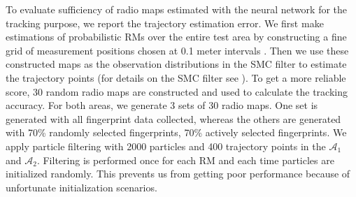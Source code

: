 \documentclass{article}
\begin{document}
	
	To evaluate sufficiency of radio maps estimated with the neural network for the tracking purpose, we report the trajectory estimation error. We first make estimations of probabilistic RMs over the entire test area by constructing a fine grid of measurement positions chosen at 0.1 meter intervals \cite{Ser2017}. Then we use these constructed maps as the observation distributions in the SMC filter to estimate the trajectory points (for details on the SMC filter see \cite{Ser2017}). To get a more reliable score, 30 random radio maps are constructed and used to calculate the tracking accuracy. For both areas, we generate 3 sets of 30 radio maps. One set is generated with all fingerprint data collected, whereas the others are generated with 70\% randomly selected fingerprints, 70\% actively selected fingerprints. We apply particle filtering with 2000 particles and 400 trajectory points in the $\mathcal{A}_1$ and $\mathcal{A}_2$. Filtering is performed once for each RM and each time particles are initialized randomly. This prevents us from getting poor performance because of unfortunate initialization scenarios.
	
\end{document}

